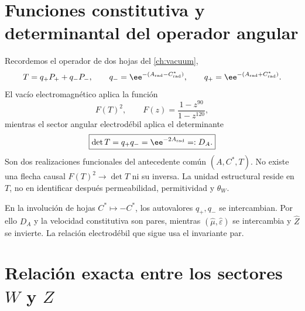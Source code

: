 \label{ch:ew}

\section{Funciones constitutiva y determinantal del operador angular}

Recordemos el operador de dos hojas del \cref{ch:vacuum},
\begin{equation}
\label{eq:ew-angular-operator}
T=q_+P_+ +q_-P_-,
\qquad
q_-=\ee^{-(A_{\rm rad}-C^*_{\rm rad})},
\qquad
q_+=\ee^{-(A_{\rm rad}+C^*_{\rm rad})}.
\end{equation}
El vac\'io electromagn\'etico aplica la funci\'on
\begin{equation}
\label{eq:ew-vacuum-reader}
F(T)^2,
\qquad
F(z)=\frac{1-z^{90}}{1-z^{120}},
\end{equation}
mientras el sector angular electrod\'ebil aplica el determinante
\begin{equation}
\label{eq:ew-determinant-reader}
\boxed{
\det T=q_+q_-=\ee^{-2A_{\rm rad}}=:D_A.}
\end{equation}
Son dos realizaciones funcionales del antecedente com\'un \((A,C^*,T)\). No existe una
flecha causal \(F(T)^2\to\det T\) ni su inversa. La unidad estructural
reside en \(T\), no en identificar despu\'es permeabilidad, permitividad y
\(\theta_W\).

En la involuci\'on de hojas \(C^*\mapsto-C^*\), los autovalores
\(q_+,q_-\) se intercambian. Por ello \(D_A\) y la velocidad constitutiva
son pares, mientras \((\widehat\mu,\widehat\varepsilon)\) se intercambia y
\(\widehat Z\) se invierte. La relaci\'on electrod\'ebil que sigue usa el
invariante par.

\section{Relaci\'on exacta entre los sectores \(W\) y \(Z\)}

